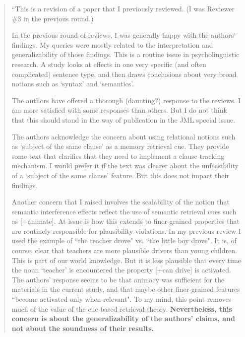 \documentclass[12pt]{article}
\begin{document}
\begin{quote}
``This is a revision of a paper that I previously reviewed. (I was Reviewer \#3 in the previous round.)

In the previous round of reviews, I was generally happy with the authors' findings. My queries were mostly related to the interpretation and generalizability of those findings. This is a routine issue in psycholinguistic research. A study looks at effects in one very specific (and often complicated) sentence type, and then draws conclusions about very broad notions such as `syntax' and `semantics'.

The authors have offered a thorough (daunting?) response to the reviews. I am more satisfied with some responses than others. But I do not think that this should stand in the way of publication in the JML special issue.

The authors acknowledge the concern about using relational notions such as `subject of the same clause' as a memory retrieval cue. They provide some text that clarifies that they need to implement a clause tracking mechanism. I would prefer it if the text was clearer about the unfeasibility of a `subject of the same clause' feature. But this does not impact their findings.

Another concern that I raised involves the scalability of the notion that semantic interference effects reflect the use of semantic retrieval cues such as [+animate]. At issue is how this extends to finer-grained properties that are routinely responsible for plausibility violations. In my previous review I used the example of ``the teacher drove" vs. ``the little boy drove". It is, of course, clear that teachers are more plausible drivers than young children. This is part of our world knowledge. But it is less plausible that every time the noun `teacher' is encountered the property [+can drive] is activated. The authors' response seems to be that animacy was sufficient for the materials in the current study, and that maybe other finer-grained features ``become activated only when relevant". To my mind, this point removes much of the value of the cue-based retrieval theory. \textbf{Nevertheless, this concern is about the generalizability of the authors' claims, and not about the soundness of their results.}


\end{quote}
\end{document}

